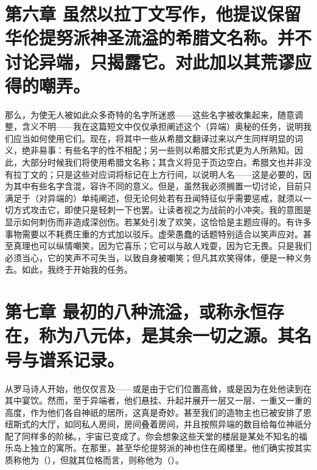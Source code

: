 
\section{第六章 虽然以拉丁文写作，他提议保留华伦提努派神圣流溢的希腊文名称。并不讨论异端，只揭露它。对此加以其荒谬应得的嘲弄。}

那么，为使无人被如此众多奇特的名字所迷惑——这些名字被收集起来，随意调整，含义不明——我在这篇短文中仅仅承担阐述这个（异端）奥秘的任务，说明我们应当如何使用它们。现在，将其中一些从希腊文翻译过来以产生同样明显的词义，绝非易事：有些名字的性不相配；另一些则以希腊文形式更为人所熟知。因此，大部分时候我们将使用希腊文名称；其含义将见于页边空白。希腊文也并非没有拉丁文的；只是这些对应词将标记在上方行间，以说明人名——这是必要的，因为其中有些名字含混，容许不同的意义。但是，虽然我必须搁置一切讨论，目前只满足于（对异端的）单纯阐述，但无论何处若有丑闻特征似乎需要惩戒，就须以一切方式攻击它，即使只是轻刺一下也罢。让读者视之为战前的小冲突。我的意图是显示如何刺伤而非造成深创伤。若某处引发了欢笑，这恰恰是主题应得的。有许多事物需要以不耗费庄重的方式加以驳斥。虚荣愚蠢的话题特别适合以笑声应对。甚至真理也可以纵情嘲笑，因为它喜乐；它可以与敌人戏耍，因为它无畏。只是我们必须当心，它的笑声不可失当，以致自身被嘲笑；但凡其欢笑得体，便是一种义务去。如此，我终于开始我的任务。\par


\section{第七章 最初的八种流溢，或称永恒存在，称为八元体，是其余一切之源。其名号与谱系记录。}

从罗马诗人开始，他仅仅言及——或是由于它们位置高耸，或是因为在处他读到在其中宴饮。然而，至于异端者，他们悬挂、升起并展开一层又一层、一重又一重的高度，作为他们各自神祇的居所，这真是奇妙。甚至我们的造物主也已被安排了恩纽斯式的大厅，如同私人房间，房间叠着房间，并且按照异端的数目给每位神祇分配了同样多的阶梯。，宇宙已变成了。你会想象这些天堂的楼层是某处不知名的福乐岛上独立的寓所。在那里，甚至华伦提努派的神也住在阁楼里。他们确实按其实质称他为（），但就其位格而言，则称他为（）。\par

